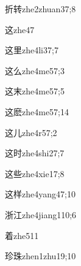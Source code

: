 \begin{verbete}{折转}{zhe2zhuan3}{7;8}
\end{verbete}

\begin{verbete}{这}{zhe4}{7}
\end{verbete}

\begin{verbete}{这里}{zhe4li3}{7;7}
\end{verbete}

\begin{verbete}{这么}{zhe4me5}{7;3}
\end{verbete}

\begin{verbete}{这末}{zhe4me5}{7;5}
\end{verbete}

\begin{verbete}{这麽}{zhe4me5}{7;14}
\end{verbete}

\begin{verbete}{这儿}{zhe4r5}{7;2}
\end{verbete}

\begin{verbete}{这时}{zhe4shi2}{7;7}
\end{verbete}

\begin{verbete}{这些}{zhe4xie1}{7;8}
\end{verbete}

\begin{verbete}{这样}{zhe4yang4}{7;10}
\end{verbete}

\begin{verbete}{浙江}{zhe4jiang1}{10;6}
\end{verbete}

\begin{verbete}{着}{zhe5}{11}
\end{verbete}

\begin{verbete}{珍珠}{zhen1zhu1}{9;10}
\end{verbete}

